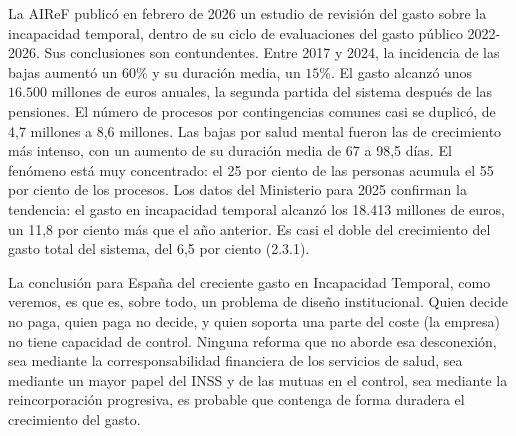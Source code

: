 \documentclass[10pt,a4paper]{article}
\begin{document}
La AIReF publicó en febrero de 2026 un estudio de revisión del gasto sobre la incapacidad temporal, dentro de su ciclo de evaluaciones del gasto público 2022-2026. Sus conclusiones son contundentes. Entre 2017 y 2024, la incidencia de las bajas aumentó un $60\%$ y su duración media, un $15\%$. El gasto alcanzó unos $16.500$ millones de euros anuales, la segunda partida del sistema después de las pensiones. El número de procesos por contingencias comunes casi se duplicó, de 4,7 millones a 8,6 millones. Las bajas por salud mental fueron las de crecimiento más intenso, con un aumento de su duración media de 67 a 98,5 días. El fenómeno está muy concentrado: el 25 por ciento de las personas acumula el 55 por ciento de los procesos. Los datos del Ministerio para 2025 confirman la tendencia: el gasto en incapacidad temporal alcanzó los 18.413 millones de euros, un 11,8 por ciento más que el año anterior. Es casi el doble del crecimiento del gasto total del sistema, del 6,5 por ciento (2.3.1).

La conclusión para España del creciente gasto en Incapacidad Temporal, como veremos, es que es, sobre todo, un problema de diseño institucional. Quien decide no paga, quien paga no decide, y quien soporta una parte del coste (la empresa) no tiene capacidad de control. Ninguna reforma que no aborde esa desconexión, sea mediante la corresponsabilidad financiera de los servicios de salud, sea mediante un mayor papel del INSS y de las mutuas en el control, sea mediante la reincorporación progresiva, es probable que contenga de forma duradera el crecimiento del gasto.
\end{document}
